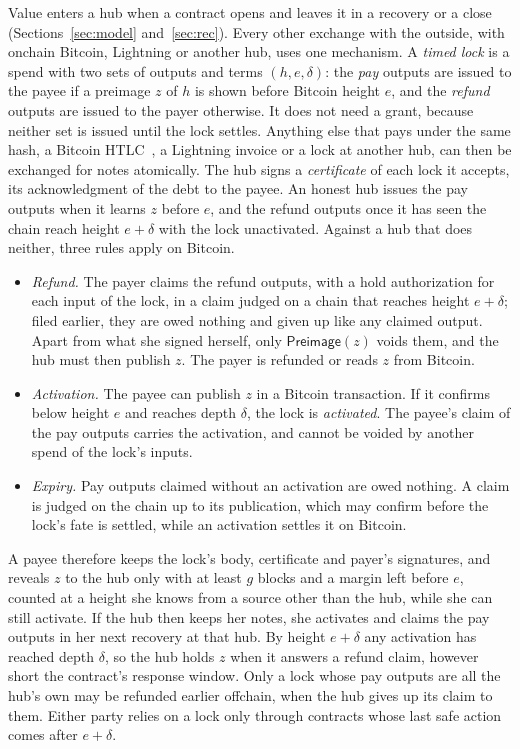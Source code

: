 \documentclass[11pt]{article}
\begin{document}
Value enters a hub when a contract opens and leaves it in a recovery or a close (Sections~\ref{sec:model} and~\ref{sec:rec}). Every other exchange with the outside, with onchain Bitcoin, Lightning or another hub, uses one mechanism. A \emph{timed lock} is a spend with two sets of outputs and terms $(h, e, \delta)$: the \emph{pay} outputs are issued to the payee if a preimage $z$ of $h$ is shown before Bitcoin height $e$, and the \emph{refund} outputs are issued to the payer otherwise. It does not need a grant, because neither set is issued until the lock settles. Anything else that pays under the same hash, a Bitcoin HTLC~\cite{htlc}, a Lightning invoice or a lock at another hub, can then be exchanged for notes atomically. The hub signs a \emph{certificate} of each lock it accepts, its acknowledgment of the debt to the payee. An honest hub issues the pay outputs when it learns $z$ before $e$, and the refund outputs once it has seen the chain reach height $e+\delta$ with the lock unactivated. Against a hub that does neither, three rules apply on Bitcoin.
\begin{itemize}[leftmargin=1.5em, itemsep=0pt]
\item \emph{Refund.} The payer claims the refund outputs, with a hold authorization for each input of the lock, in a claim judged on a chain that reaches height $e+\delta$; filed earlier, they are owed nothing and given up like any claimed output. Apart from what she signed herself, only $\mathsf{Preimage}(z)$ voids them, and the hub must then publish $z$. The payer is refunded or reads $z$ from Bitcoin.
\item \emph{Activation.} The payee can publish $z$ in a Bitcoin transaction. If it confirms below height $e$ and reaches depth $\delta$, the lock is \emph{activated}. The payee's claim of the pay outputs carries the activation, and cannot be voided by another spend of the lock's inputs.
\item \emph{Expiry.} Pay outputs claimed without an activation are owed nothing. A claim is judged on the chain up to its publication, which may confirm before the lock's fate is settled, while an activation settles it on Bitcoin.
\end{itemize}
A payee therefore keeps the lock's body, certificate and payer's signatures, and reveals $z$ to the hub only with at least $g$ blocks and a margin left before $e$, counted at a height she knows from a source other than the hub, while she can still activate. If the hub then keeps her notes, she activates and claims the pay outputs in her next recovery at that hub. By height $e+\delta$ any activation has reached depth $\delta$, so the hub holds $z$ when it answers a refund claim, however short the contract's response window. Only a lock whose pay outputs are all the hub's own may be refunded earlier offchain, when the hub gives up its claim to them. Either party relies on a lock only through contracts whose last safe action comes after $e+\delta$.
\end{document}
